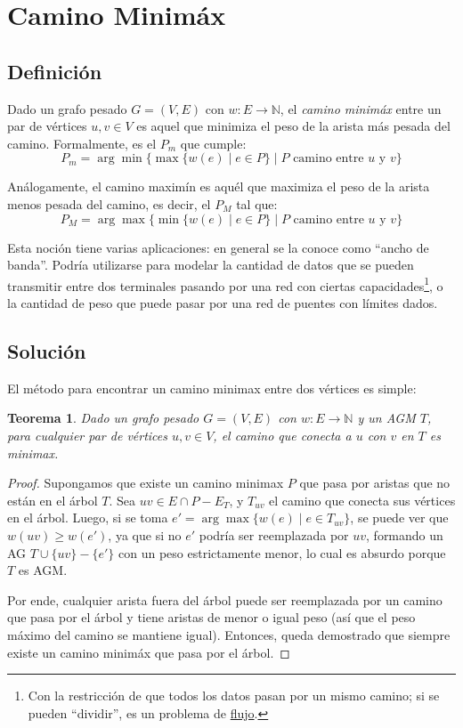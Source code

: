 \documentclass[a4paper]{report}
\newcommand{\N}{\mathbb{N}}
\newtheorem*{theorem*}{Teorema}
\begin{document}
\section{Camino Minimáx}

\subsection{Definición}

Dado un grafo pesado $G = (V, E)$ con $w: E \longrightarrow \N$, el \textit{camino minimáx} entre un par de vértices $u, v \in V$ es aquel que minimiza el peso de la arista más pesada del camino. Formalmente, es el $P_m$ que cumple:
$$P_m = \arg\min{\{\max{\{w(e) \mid e \in P\}} \mid P \text{ camino entre $u$ y $v$}\}}$$

Análogamente, el camino maximín es aquél que maximiza el peso de la arista menos pesada del camino, es decir, el $P_M$ tal que:
$$P_M = \arg\max{\{\min{\{w(e) \mid e \in P\}} \mid P \text{ camino entre $u$ y $v$}\}}$$


Esta noción tiene varias aplicaciones: en general se la conoce como ``ancho de banda''. Podría utilizarse para modelar la cantidad de datos que se pueden transmitir entre dos terminales pasando por una red con ciertas capacidades\footnote{Con la restricción de que todos los datos pasan por un mismo camino; si se pueden ``dividir'', es un problema de \hyperref[flujo]{flujo}.}, o la cantidad de peso que puede pasar por una red de puentes con límites dados.

\subsection{Solución}

El método para encontrar un camino minimax entre dos vértices es simple:
\begin{theorem*}
    Dado un grafo pesado $G = (V, E)$ con $w: E \longrightarrow \N$ y un AGM $T$, para cualquier par de vértices $u,v \in V$, el camino que conecta a $u$ con $v$ en $T$ es minimax.
\end{theorem*}
\begin{proof}
    Supongamos que existe un camino minimax $P$ que pasa por aristas que no están en el árbol $T$. Sea $uv \in E \cap P - E_T$, y $T_{uv}$ el camino que conecta sus vértices en el árbol. Luego, si se toma $e' = \arg\max{\{w(e) \mid e \in T_{uv}\}}$, se puede ver que $w(uv) \geq w(e')$, ya que si no $e'$ podría ser reemplazada por $uv$, formando un AG $T \cup \{uv\} - \{e'\}$ con un peso estrictamente menor, lo cual es absurdo porque $T$ es AGM.

    Por ende, cualquier arista fuera del árbol puede ser reemplazada por un camino que pasa por el árbol y tiene aristas de menor o igual peso (así que el peso máximo del camino se mantiene igual). Entonces, queda demostrado que siempre existe un camino minimáx que pasa por el árbol.

\end{proof}
\end{document}
